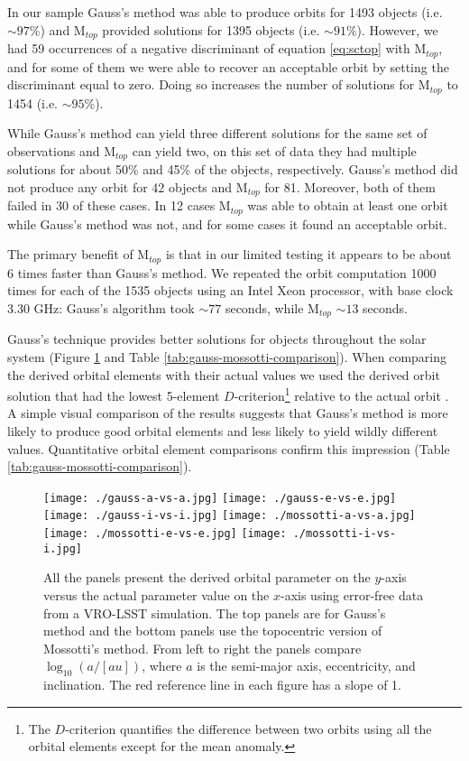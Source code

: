\documentclass[11pt]{article}
\begin{document}
In our sample Gauss's method was able to produce orbits for 1493 objects (i.e. $\sim97$\%) and M$_{top}$ provided solutions for 1395 objects (i.e. $\sim91$\%). 
However, we had 59 occurrences of a negative discriminant of equation \eqref{eq:sctop} with M$_{top}$, and for some of them we were able to recover an acceptable orbit by setting the discriminant equal to zero.  
Doing so increases the number of solutions for M$_{top}$ to 1454 (i.e. $\sim95$\%).
  
While Gauss's method can yield three different solutions for the same set of observations and M$_{top}$ can yield two, on this set of data they had multiple solutions for about 50\% and 45\% of the objects, respectively. 
Gauss's method did not produce any orbit for 42 objects and M$_{top}$ for 81. 
Moreover, both of them failed in 30 of these cases. 
In 12 cases M$_{top}$ was able to obtain at least one orbit while Gauss's method was not, and for some cases it found an acceptable orbit.

The primary benefit of M$_{top}$ is that in our limited testing it appears to be about $6$ times faster than Gauss's method. 
We repeated the orbit computation 1000 times for each of the 1535 objects using an Intel Xeon processor, with base clock 3.30 GHz: Gauss's algorithm took $\sim 77$ seconds, while M$_{top}$ $\sim 13$ seconds.
 
Gauss's technique provides better solutions for objects throughout the solar system (Figure \ref{fig:aei-vs-aei} and Table \ref{tab:gauss-mossotti-comparison}).  
When comparing the derived orbital elements with their actual values we used the derived orbit solution that had the lowest 5-element $D$-criterion\footnote{The $D$-criterion quantifies the difference between two orbits using all the orbital elements except for the mean anomaly.} relative to the actual orbit \cite{Drummond1981-Dcriterion}.
A simple visual comparison of the results suggests that Gauss's method is more likely to produce good orbital elements and less likely to yield wildly different values. 
Quantitative orbital element comparisons confirm this impression (Table \ref{tab:gauss-mossotti-comparison}). 


\begin{figure}[ht!]
    \centering
    \texttt{[image: ./gauss-a-vs-a.jpg]}
    \texttt{[image: ./gauss-e-vs-e.jpg]}
    \texttt{[image: ./gauss-i-vs-i.jpg]}
    \texttt{[image: ./mossotti-a-vs-a.jpg]}
    \texttt{[image: ./mossotti-e-vs-e.jpg]}
    \texttt{[image: ./mossotti-i-vs-i.jpg]}
    \caption{All the panels present the derived orbital parameter on the $y$-axis versus the actual parameter value on the $x$-axis using error-free data from a VRO-LSST simulation. 
    The top panels are for Gauss's method and the bottom panels use the topocentric version of Mossotti's method. 
    From left to right the panels compare $\log_{10}(a/[au])$, where $a$ is the semi-major axis, eccentricity, and inclination. The red reference line in each figure has a slope of 1.}
    \label{fig:aei-vs-aei}
\end{figure}
\end{document}
